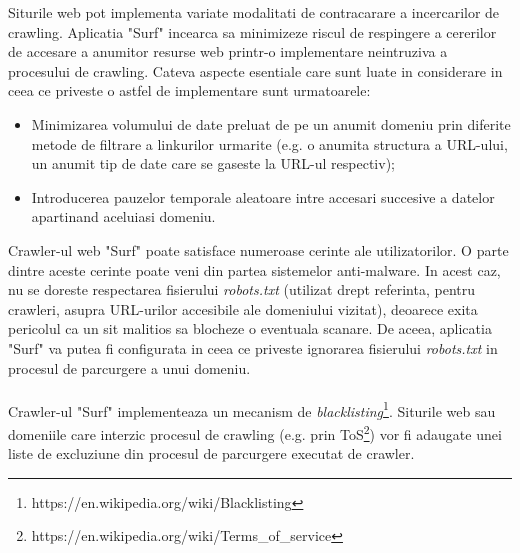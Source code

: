 Siturile web pot implementa variate modalitati de contracarare a incercarilor de crawling. Aplicatia "Surf" incearca sa minimizeze riscul de respingere a cererilor de accesare a anumitor resurse web printr-o implementare neintruziva a procesului de crawling. Cateva aspecte esentiale care sunt luate in considerare in ceea ce priveste o astfel de implementare sunt urmatoarele:

\begin{itemize}

	\item{Minimizarea volumului de date preluat de pe un anumit domeniu prin diferite metode de filtrare a linkurilor urmarite (e.g. o anumita structura a URL-ului, un anumit tip de date care se gaseste la URL-ul respectiv);}
	
	\item{Introducerea pauzelor temporale aleatoare intre accesari succesive a datelor apartinand aceluiasi domeniu.}
	
\end{itemize}

\noindent
Crawler-ul web "Surf" poate satisface numeroase cerinte ale utilizatorilor. O parte dintre aceste cerinte poate veni din partea sistemelor anti-malware. In acest caz, nu se doreste respectarea fisierului \emph{robots.txt} (utilizat drept referinta, pentru crawleri, asupra URL-urilor accesibile ale domeniului vizitat), deoarece exita pericolul ca un sit malitios sa blocheze o eventuala scanare. De aceea, aplicatia "Surf" va putea fi configurata in ceea ce priveste ignorarea fisierului \emph{robots.txt} in procesul de parcurgere a unui domeniu.
\\
\\
Crawler-ul "Surf" implementeaza un mecanism de \emph{blacklisting}\footnote{https://en.wikipedia.org/wiki/Blacklisting}. Siturile web sau domeniile care interzic procesul de crawling (e.g. prin ToS\footnote{https://en.wikipedia.org/wiki/Terms\_of\_service}) vor fi adaugate unei liste de excluziune din procesul de parcurgere executat de crawler.
